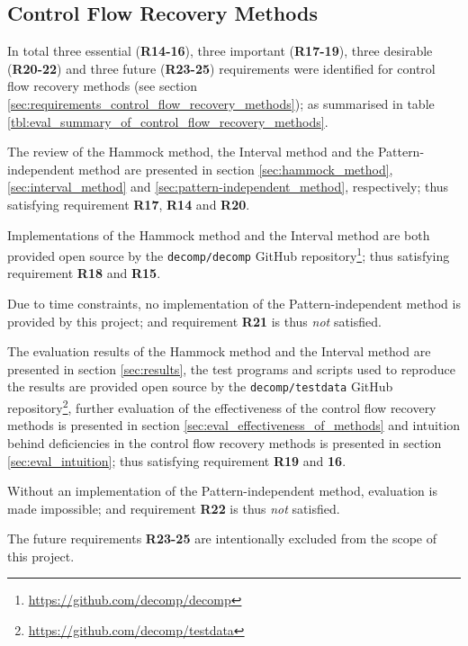 
\subsection{Control Flow Recovery Methods}

In total three essential (\textbf{R14-16}), three important (\textbf{R17-19}), three desirable (\textbf{R20-22}) and three future (\textbf{R23-25}) requirements were identified for control flow recovery methods (see section \ref{sec:requirements_control_flow_recovery_methods}); as summarised in table \ref{tbl:eval_summary_of_control_flow_recovery_methods}.

The review of the Hammock method, the Interval method and the Pattern-independent method are presented in section \ref{sec:hammock_method}, \ref{sec:interval_method} and \ref{sec:pattern-independent_method}, respectively; thus satisfying requirement \textbf{R17}, \textbf{R14} and \textbf{R20}.

Implementations of the Hammock method and the Interval method are both provided open source by the \texttt{decomp/decomp} GitHub repository\footnote{\url{https://github.com/decomp/decomp}}; thus satisfying requirement \textbf{R18} and \textbf{R15}.

Due to time constraints, no implementation of the Pattern-independent method is provided by this project; and requirement \textbf{R21} is thus \textit{not} satisfied.

The evaluation results of the Hammock method and the Interval method are presented in section \ref{sec:results}, the test programs and scripts used to reproduce the results are provided open source by the \texttt{decomp/testdata} GitHub repository\footnote{\url{https://github.com/decomp/testdata}}, further evaluation of the effectiveness of the control flow recovery methods is presented in section \ref{sec:eval_effectiveness_of_methods} and intuition behind deficiencies in the control flow recovery methods is presented in section \ref{sec:eval_intuition}; thus satisfying requirement \textbf{R19} and \textbf{16}.

Without an implementation of the Pattern-independent method, evaluation is made impossible; and requirement \textbf{R22} is thus \textit{not} satisfied.

The future requirements \textbf{R23-25} are intentionally excluded from the scope of this project.


